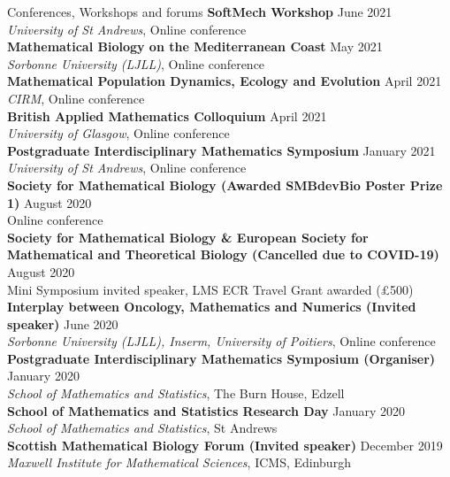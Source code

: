 \documentclass{resume} %
\begin{document}
\begin{rSection}{Conferences, Workshops and forums}
{\bf SoftMech Workshop} \hfill {June 2021} \\
{{\em University of St Andrews}, Online conference} \\
{\bf Mathematical Biology on the Mediterranean Coast} \hfill {May 2021} \\
{{\em Sorbonne University (LJLL)}, Online conference} \\
{\bf Mathematical Population Dynamics, Ecology and Evolution} \hfill {April 2021} \\
{{\em CIRM}, Online conference} \\
{\bf British Applied Mathematics Colloquium} \hfill {April 2021} \\
{{\em University of Glasgow}, Online conference} \\
{\bf Postgraduate Interdisciplinary Mathematics Symposium} \hfill {January 2021} \\
{{\em  University of St Andrews}, Online conference} \\
{\bf Society for Mathematical Biology (Awarded SMBdevBio Poster Prize 1)} \hfill {August 2020} \\
{Online conference} \\
{\bf Society for Mathematical Biology \& European Society for Mathematical and Theoretical Biology (Cancelled due to COVID-19)} \hfill {August 2020} \\
{%
Mini Symposium invited speaker, LMS ECR Travel Grant awarded (\pounds 500)} \\
{\bf Interplay between Oncology, Mathematics and Numerics (Invited speaker)} \hfill {June 2020} \\
{{\em Sorbonne University (LJLL), Inserm, University of Poitiers}, Online conference} \\
{\bf Postgraduate Interdisciplinary Mathematics Symposium (Organiser)} \hfill {January 2020} \\
{{\em  School of Mathematics and Statistics}, The Burn House, Edzell} \\
{\bf School of Mathematics and Statistics Research Day} \hfill {January 2020} \\
{{\em  School of Mathematics and Statistics}, St Andrews} \\
{\bf Scottish Mathematical Biology Forum (Invited speaker)} \hfill {December 2019} \\
{{\em  Maxwell Institute for Mathematical Sciences}, ICMS, Edinburgh} \\

\end{rSection}
\end{document}
